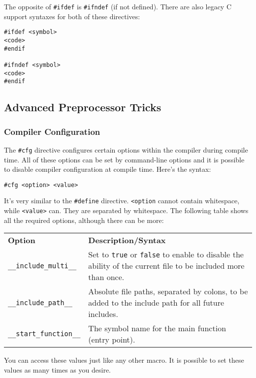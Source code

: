 \documentclass[10pt,a4paper]{article}
\begin{document}
The opposite of \verb|#ifdef| is \verb|#ifndef| (if not defined). There are also legacy C support syntaxes for both of these directives:
\begin{verbatim}
#ifdef <symbol>
<code>
#endif

#ifndef <symbol>
<code>
#endif
\end{verbatim}

\newpage



\subsection{Advanced Preprocessor Tricks}

\subsubsection{Compiler Configuration}

The \verb|#cfg| directive configures certain options within the compiler during compile time. All of these options can be set by command-line options and it is possible to disable compiler configuration at compile time. Here's the syntax:
\begin{verbatim}
#cfg <option> <value>
\end{verbatim}

It's very similar to the \verb|#define| directive. \verb|<option| cannot contain whitespace, while \verb|<value>| can. They are separated by whitespace. The following table shows all the required options, although there can be more: \newline
\begin{tabular}{| l p{10cm} |}
\hline
\textbf{Option} & \textbf{Description/Syntax} \\
\verb|__include_multi__| & Set to \verb|true| or \verb|false| to enable to disable the ability of the current file to be included more than once. \\
\verb|__include_path__| & Absolute file paths, separated by colons, to be added to the include path for all future includes. \\
\verb|__start_function__| & The symbol name for the main function (entry point). \\
\hline
\end{tabular}

You can access these values just like any other macro. It is possible to set these values as many times as you desire.

\newpage
\end{document}
